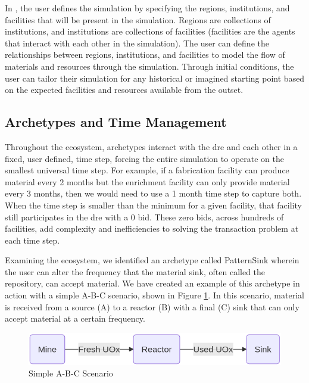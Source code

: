 
In \cyclus, the user defines the simulation by specifying the regions, institutions, and facilities that will be present in the simulation. Regions are collections of institutions, and institutions are collections of facilities (facilities are the agents that interact with each other in the simulation). The user can define the relationships between regions, institutions, and facilities to model the flow of materials and resources through the simulation. Through initial conditions, the user can tailor their simulation for any historical or imagined starting point based on the expected facilities and resources available from the outset.


\subsection{Archetypes and Time Management}
\label{sec:archetypes_and_time_management}

Throughout the \cyclus ecosystem, archetypes interact with the \gls{dre} and each other in a fixed, user defined, time step, forcing the entire simulation to operate on the smallest universal time step. For example, if a fabrication facility can produce material every 2 months but the enrichment facility can only provide material every 3 months, then we would need to use a 1 month time step to capture both. When the time step is smaller than the minimum for a given facility, that facility still participates in the \gls{dre} with a 0 bid. These zero bids, across hundreds of facilities, add complexity and inefficiencies to solving the transaction problem at each time step.

Examining the \cyclus ecosystem, we identified an archetype called PatternSink wherein the user can alter the frequency that the material sink, often called the repository, can accept material. We have created an example of this archetype in action with a simple A-B-C scenario, shown in Figure \ref{fig:a-b-c}. In this scenario, material is received from a source (A) to a reactor (B) with a final (C) sink that can only accept material at a certain frequency.

\begin{figure}[!ht]
    \centering
    \includegraphics[scale=0.4]{images/cyclus/a-b-c.png}
    \caption{Simple A-B-C Scenario}
    \label{fig:a-b-c}
\end{figure}

